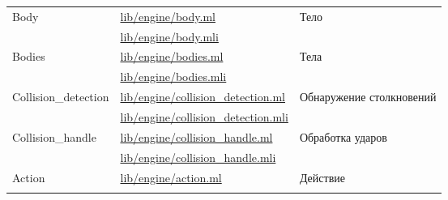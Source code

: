 \begin{centering}
\begin{longtable}{|l|l|l|}
        \multirow{2}{*}{Body}                                 & \href{https://github.com/prekel/chapgame/blob/master/lib/engine/body.ml}{lib/engine/body.ml}                                   & \multirow{2}{*}{Тело}                       \\\nopagebreak \cline{2-2}
                                                              & \href{https://github.com/prekel/chapgame/blob/master/lib/engine/body.mli}{lib/engine/body.mli}                                 &                                             \\ \hline
        \multirow{2}{*}{Bodies}                               & \href{https://github.com/prekel/chapgame/blob/master/lib/engine/bodies.ml}{lib/engine/bodies.ml}                               & \multirow{2}{*}{Тела}                       \\\nopagebreak \cline{2-2}
                                                              & \href{https://github.com/prekel/chapgame/blob/master/lib/engine/bodies.mli}{lib/engine/bodies.mli}                             &                                             \\ \hline
        \multirow{2}{*}{Collision\_detection}                 & \href{https://github.com/prekel/chapgame/blob/master/lib/engine/collision\_detection.ml}{lib/engine/collision\_detection.ml}   & \multirow{2}{2cm}{Обнаружение столкновений} \\\nopagebreak \cline{2-2}
                                                              & \href{https://github.com/prekel/chapgame/blob/master/lib/engine/collision\_detection.mli}{lib/engine/collision\_detection.mli} &                                             \\ \hline
        \multirow{2}{*}{Collision\_handle}                    & \href{https://github.com/prekel/chapgame/blob/master/lib/engine/collision\_handle.ml}{lib/engine/collision\_handle.ml}         & \multirow{2}{*}{Обработка ударов}           \\\nopagebreak \cline{2-2}
                                                              & \href{https://github.com/prekel/chapgame/blob/master/lib/engine/collision\_handle.mli}{lib/engine/collision\_handle.mli}       &                                             \\ \hline
        \multirow{2}{*}{Action}                               & \href{https://github.com/prekel/chapgame/blob/master/lib/engine/action.ml}{lib/engine/action.ml}                               & \multirow{2}{*}{Действие}                   \\\nopagebreak \cline{2-2}

\end{longtable}
\end{centering}
